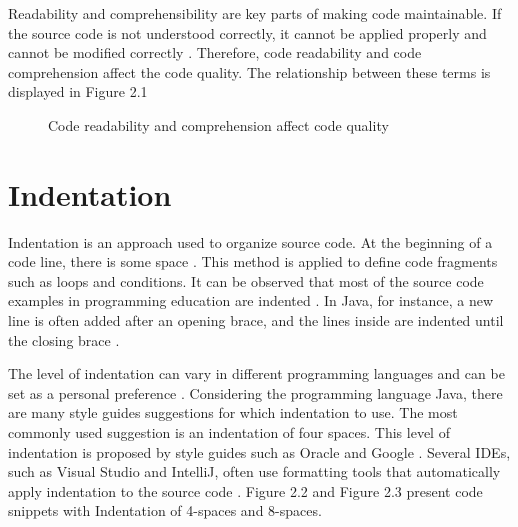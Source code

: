 Readability and comprehensibility are key parts of making code maintainable. 
If the source code is not understood correctly, it cannot be applied properly and cannot be modified correctly \cite{izu2025introducing}. Therefore, code readability and code comprehension affect the code quality. The relationship between these terms is displayed in Figure 2.1



\begin{figure}[H]
\centering
{}
\caption{Code readability and  comprehension affect code quality}
\label{fig:readability-comprehension-quality}
\end{figure}




\section{Indentation}

Indentation is an approach used to organize source code. At the beginning of a code line, there is some space \cite{morzeck2023indentation}.
This method is applied to define code fragments such as loops and conditions.  It can be observed that most of the source code examples in programming education are indented \cite{morzeck2023indentation}. In Java, for instance, a new line is often added after an opening brace, and the lines inside are indented until the closing brace \cite{hanenberg2024indentation}.


The level of indentation can vary in different programming languages and can be set as a personal preference \cite{bauer2017indentations}. Considering the programming language Java, there are many style guides suggestions for which indentation to use. The most commonly used suggestion is an indentation of four spaces. This level of indentation is proposed by style guides such as Oracle and Google \cite{bauer2017indentations}.
Several IDEs, such as Visual Studio and IntelliJ, often use formatting tools that automatically apply indentation to the source code \cite{morzeck2023indentation}. Figure 2.2 and Figure 2.3 present code snippets with Indentation of 4-spaces and 8-spaces.

